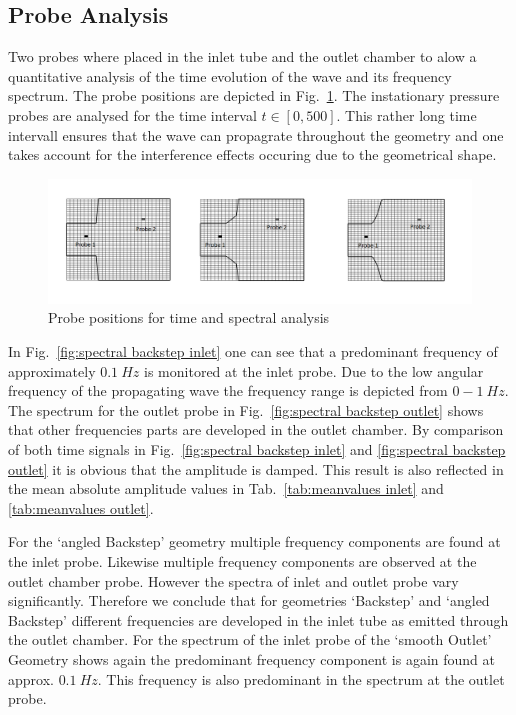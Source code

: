 \documentclass[fleqn,12pt]{NTFD} %
\begin{document}
\clearpage

\subsection{Probe Analysis}
Two probes where placed in the inlet tube and the outlet chamber to alow a quantitative analysis of the time evolution of the wave and its frequency spectrum. The probe positions are depicted in Fig.~\ref{fig:probe positions}. The instationary pressure probes are analysed for the time interval $t \in [0, 500]$. This rather long time intervall ensures that the wave can propagrate throughout the geometry and one takes account for the interference effects occuring due to the geometrical shape.

\begin{figure}[ht]\centering %
\includegraphics[width=\linewidth]{probe_positions.png}
\caption{Probe positions for time and spectral analysis}
\label{fig:probe positions}
\end{figure}

In Fig.~\ref{fig:spectral backstep inlet} one can see that a predominant frequency of approximately $0.1 \ Hz$ is monitored at the inlet probe. Due to the low angular frequency of the propagating wave the frequency range is depicted from $0-1 \ Hz$. The spectrum for the outlet probe in Fig.~\ref{fig:spectral backstep outlet} shows that other frequencies parts are developed in the outlet chamber. By comparison of both time signals in Fig.~\ref{fig:spectral backstep inlet} and \ref{fig:spectral backstep outlet} it is obvious that the amplitude is damped. This result is also reflected in the mean absolute amplitude values in Tab.~\ref{tab:meanvalues inlet} and \ref{tab:meanvalues outlet}. 

For the `angled Backstep' geometry multiple frequency components are found at the inlet probe. Likewise multiple frequency components are observed at the outlet chamber probe. However the spectra of inlet and outlet probe vary significantly. Therefore we conclude that for geometries `Backstep' and `angled Backstep' different frequencies are developed in the inlet tube as emitted through the outlet chamber. For the spectrum of the inlet probe of the `smooth Outlet' Geometry shows again the predominant frequency component is again found at approx. $0.1 \ Hz$. This frequency is also predominant in the spectrum at the outlet probe.
\end{document}
